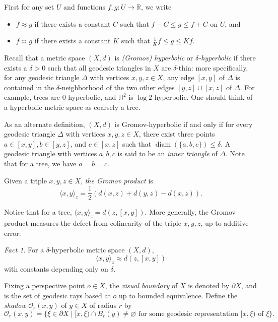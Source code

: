 \documentclass[11pt]{amsart}
\theoremstyle{plain}
\theoremstyle{definition}
\theoremstyle{remark}
\newtheorem{fact}[proposition]{Fact}
\DeclareMathOperator{\diam}{diam}
\begin{document}
First for any set $U$ and functions $f,g\colon U\to \mathbb R$, we write 
\begin{itemize}
  \item $f\approx g$ if there exists a constant $C$ such that $f-C\leq g\leq
    f+C$ on $U$, and 
  \item $f\asymp g$ if there exists a constant $K$ such that $\frac1Kf\leq
    g\leq Kf$. 
\end{itemize}

Recall that a metric space $(X,d)$ is {\em (Gromov) hyperbolic} or {\em
$\delta$-hyperbolic} if there exists a $\delta>0$ such that all geodesic
triangles in $X$ are $\delta$-thin: more specifically, for any geodesic
triangle $\Delta$ with vertices $x,y,z\in X$,
any edge $[x,y]$ of $\Delta$ is contained in the
$\delta$-neighborhood of the two other edges $[y,z]\cup [x,z]$ 
of $\Delta$. For example,
trees are 0-hyperbolic, and $\mathbb H^2$ is $\log 2$-hyperbolic. One
should think of a hyperbolic metric space as coarsely a tree. 

As an alternate definition, $(X,d)$ is Gromov-hyperbolic if and only if
for every geodesic triangle $\Delta$ with vertices $x,y,z\in
X$, there exist three points
$a\in[x,y],b\in[y,z]$, and $c\in[x,z]$ such that $\diam(\{a,b,c\})\leq
\delta$. A geodesic triangle with vertices $a,b,c$ is said to be an
{\em inner triangle} of $\Delta$. Note that for a tree, we have $a=b=c$. 

Given a triple $x,y,z\in X$, {\em the Gromov product} is 
\[
  \langle x,y\rangle_z=\frac12(d(x,z)+d(y,z)-d(x,z)).
\]

Notice that for a tree, $\langle x,y\rangle_z=d(z,[x,y])$. More
generally, 
the Gromov product measures the defect from colinearity of the triple
$x,y,z$, up to additive error:  


\begin{fact}
  For a $\delta$-hyperbolic metric space $(X,d)$, 
  \[
    \langle x,y\rangle_z\approx d(z,[x,y])
  \]
  with constants depending only on $\delta$. 
\end{fact}


Fixing a perspective point $o\in X$, the {\em visual boundary} of
$X$ is denoted by $\partial X$, and is the set of geodesic rays based at
$o$ up to bounded equivalence. Define the {\em shadow} $\mathcal
O_r(x,y)$ of $y\in X$ of
radius $r$ by 
\[
  \mathcal O_r(x,y)=\{\xi\in\partial X\mid [x,\xi)\cap B_r(y)\neq \varnothing
    \text{ for some geodesic representation }[x,\xi)\text{ of }\xi
\}.
\]
\end{document}
